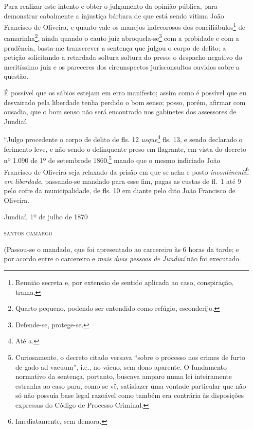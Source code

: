 Para realizar este intento e obter o julgamento da opinião pública, para
demonstrar cabalmente a injustiça bárbara de que está sendo vítima João
Francisco de Oliveira, e quanto vale os manejos indecorosos dos
conciliábulos\footnote{ Reunião secreta e, por extensão de sentido
  aplicada ao caso, conspiração, trama.} de camarinha\footnote{ Quarto
  pequeno, podendo ser entendido como refúgio, esconderijo.}, ainda
quando o cauto juiz abroquela-se\footnote{ Defende-se, protege-se.} com
a probidade e com a prudência, basta-me transcrever a sentença que
julgou o corpo de delito; a petição solicitando a retardada soltura
soltura do preso; o despacho negativo do meritíssimo juiz e os pareceres
dos circunspectos jurisconsultos ouvidos sobre a questão.

É possível que os sábios estejam em erro manifesto; assim como é
possível que eu desvairado pela liberdade tenha perdido o bom senso;
posso, porém, afirmar com ousadia, que o bom senso não será encontrado
nos gabinetes dos assessores de Jundiaí.

\asterisc{}

``Julgo procedente o corpo de delito de fls. 12 \emph{usque}\footnote{
  Até a.} fls. 13, e sendo declarado o ferimento leve, e não sendo o
delinquente preso em flagrante, em vista do decreto nº 1.090 de 1º de
setembrode 1860,\footnote{ Curiosamente, o decreto citado versava
  ``sobre o processo nos crimes de furto de gado ad vacuum'', i.e., no
  vácuo, sem dono aparente. O fundamento normativo da sentença,
  portanto, buscava amparo numa lei inteiramente estranha ao caso para,
  como se vê, satisfazer uma vontade particular que não só não possuía
  base legal razoável como também era contrária às disposições expressas
  do Código de Processo Criminal.} mando que o mesmo indiciado João
Francisco de Oliveira seja relaxado da prisão em que se acha e posto
\emph{incontinenti}\footnote{ Imediatamente, sem demora.} \emph{em
liberdade}, passando-se mandado para esse fim, pagas as custas de fl.~1
até 9 pelo cofre da municipalidade, de fls. 10 em diante pelo dito João
Francisco de Oliveira.

\begin{flushright}
Jundiaí, 1º de julho de 1870

\textsc{santos camargo}
\end{flushright}

(Passou-se o mandado, que foi apresentado ao carcereiro às 6 horas da
tarde; e por acordo entre o carcereiro e \emph{mais duas pessoas de
Jundiaí} não foi executado.

